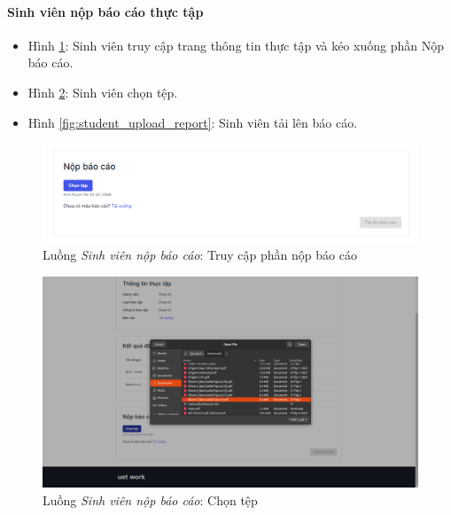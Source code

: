 \documentclass[./../main.tex]{subfiles}
\begin{document}
\paragraph*{Sinh viên nộp báo cáo thực tập}

\begin{itemize}
	\item Hình \ref{fig:student_internship_info}: Sinh viên truy cập trang thông tin thực tập và kéo xuống phần Nộp báo cáo. 
	\item Hình \ref{fig:student_choose_file}: Sinh viên chọn tệp.
	\item Hình \ref{fig:student_upload_report}: Sinh viên tải lên báo cáo.
\end{itemize}

\begin{figure}[]
	\includegraphics[width=\linewidth]{./images/image41.png}
	\caption{Luồng \emph{Sinh viên nộp báo cáo}: Truy cập phần nộp báo cáo}
	\label{fig:student_internship_info}
\end{figure}

\begin{figure}[]
	\includegraphics[width=\linewidth]{./images/image42.png}
	\caption{Luồng \emph{Sinh viên nộp báo cáo}: Chọn tệp}
	\label{fig:student_choose_file}
\end{figure}
\end{document}
